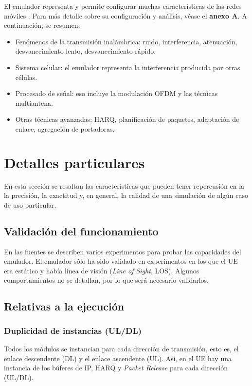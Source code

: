 \documentclass[12pt]{report} %
\begin{document}
El emulador representa y permite configurar muchas características de las redes móviles \cite{RefWorks:5, RefWorks:3, RefWorks:7, RefWorks:100}.
Para más detalle sobre su configuración y análisis, véase el \textbf{anexo A}.
A continuación, se resumen:
\begin{itemize}
\item Fenómenos de la transmisión inalámbrica:
ruido, interferencia, atenuación, desvanecimiento lento, desvanecimiento rápido.
\item Sistema celular:
el emulador representa la interferencia producida por otras células.
\item Procesado de señal:
eso incluye la modulación OFDM y las técnicas multiantena.
\item Otras técnicas avanzadas:
HARQ, planificación de paquetes, adaptación de enlace, agregación de portadoras.
\end{itemize}

\section{Detalles particulares}

En esta sección se resaltan las características que pueden tener repercusión en la la precisión, la exactitud y, en general, la calidad de una simulación de algún caso de uso particular.

\subsection{Validación del funcionamiento}

En las fuentes se describen varios experimentos para probar las capacidades del emulador.
El emulador sólo ha sido validado en experimentos en los que el UE era estático y había línea de visión (\textit{Line of Sight}, LOS). \cite{RefWorks:5, RefWorks:3}
Algunos comportamientos no se detallan, por lo que será necesario validarlos.

\subsection{Relativas a la ejecución}

\subsubsection{Duplicidad de instancias (UL/DL)}

Todos los módulos se instancian para cada dirección de transmisión, esto es, el enlace descendente (DL) y el enlace ascendente (UL).
Así, en el UE hay una instancia de los búferes de IP, HARQ y \textit{Packet Release} para cada dirección (UL/DL). \cite{RefWorks:5, RefWorks:3, RefWorks:7}
\end{document}
